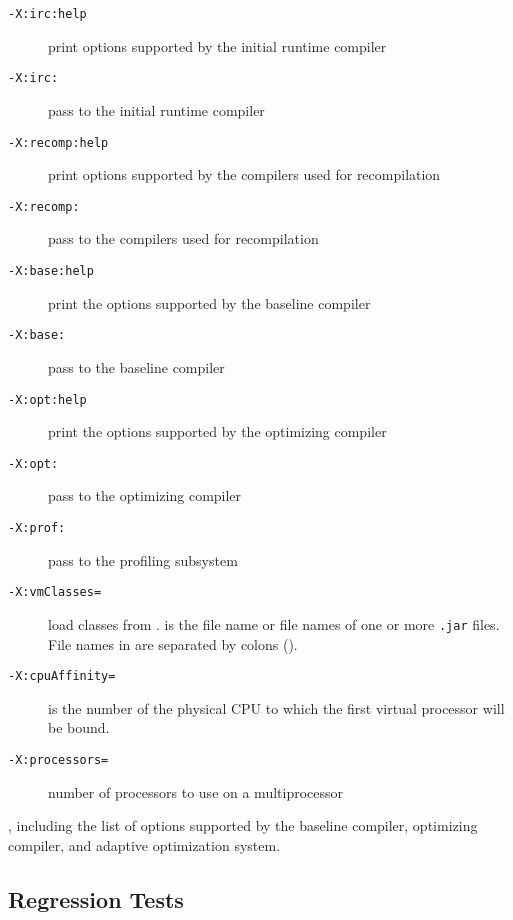 \begin{description}
\item[{\tt -X:irc\Mlsq{}:help\Mrsq{}}]
print options supported by the initial runtime compiler

\item[{\tt -X:irc:}]
pass  to the initial runtime compiler

\item[{\tt -X:recomp\Mlsq{}:help\Mrsq{}}]
print options supported by the compilers used for recompilation

\item[{\tt -X:recomp:}]
pass  to the compilers used for recompilation

\item[{\tt -X:base\Mlsq{}:help\Mrsq{}}]
print the options supported by the baseline compiler

\item[{\tt -X:base:}]
pass  to the baseline compiler

\item[{\tt -X:opt\Mlsq{}:help\Mrsq{}}]
print the options supported by the optimizing compiler

\item[{\tt -X:opt:}]
pass  to the optimizing compiler

\item[{\tt -X:prof:}]
pass  to the profiling subsystem

\item[{\tt -X:vmClasses=}]
load classes from .   is the file name or
file names of one or more {\tt .jar} files.  File names in
 are separated by colons (\Mlitch{:}).

\item[{\tt -X:cpuAffinity=}]
 is the number of the physical CPU to which the first virtual processor will be bound.

\item[{\tt -X:processors=\Mlsq{}  \Mor{}  \Mrsq{}}]
number of processors to use on a multiprocessor

\end{description}

, including the list of options supported by the baseline
compiler, optimizing compiler, and adaptive optimization system. 

\subsection{Regression Tests}
\label{sec:regression}


